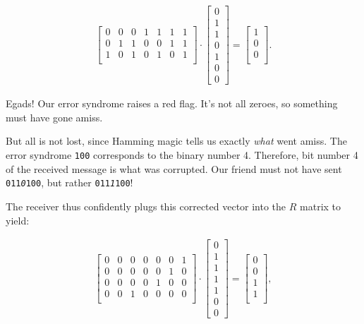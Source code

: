 \begin{alttitles}
\vspace{-.15in}
\begin{align*}
\begin{bmatrix}
0 & 0 & 0 & 1 & 1 & 1 & 1 \\
0 & 1 & 1 & 0 & 0 & 1 & 1 \\
1 & 0 & 1 & 0 & 1 & 0 & 1 \\
\end{bmatrix} \cdot
\begin{bmatrix}
0 \\ 1 \\ 1 \\ 0 \\ 1 \\ 0 \\ 0
\end{bmatrix} =
\begin{bmatrix}
1 \\ 0 \\ 0 \\
\end{bmatrix}.
\end{align*}
\vspace{-.15in}

Egads! Our error syndrome raises a red flag. It's not all zeroes, so something
must have gone amiss.

But all is not lost, since Hamming magic tells us exactly \textit{what} went
amiss. The error syndrome \texttt{100} corresponds to the binary number 4.
Therefore, bit number 4 of the received message is what was corrupted. Our
friend must not have sent \texttt{011\textit{0}100}, but rather
\texttt{011\textit{1}100}!

The receiver thus confidently plugs this corrected vector into the $R$ matrix
to yield:

\vspace{-.15in}
\begin{align*}
\begin{bmatrix}
0 & 0 & 0 & 0 & 0 & 0 & 1 \\
0 & 0 & 0 & 0 & 0 & 1 & 0 \\
0 & 0 & 0 & 0 & 1 & 0 & 0 \\
0 & 0 & 1 & 0 & 0 & 0 & 0 \\
\end{bmatrix} \cdot
\begin{bmatrix}
0 \\ 1 \\ 1 \\ 1 \\ 1 \\ 0 \\ 0
\end{bmatrix} =
\begin{bmatrix}
0 \\ 0 \\ 1 \\ 1 \\
\end{bmatrix},
\end{align*}
\vspace{-.15in}


\end{alttitles}
